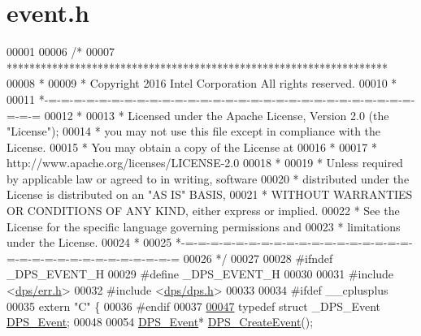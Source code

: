 \hypertarget{event_8h_source}{}\section{event.\+h}
\label{event_8h_source}

\begin{DoxyCode}
00001 
00006 \textcolor{comment}{/*}
00007 \textcolor{comment}{ *******************************************************************}
00008 \textcolor{comment}{ *}
00009 \textcolor{comment}{ * Copyright 2016 Intel Corporation All rights reserved.}
00010 \textcolor{comment}{ *}
00011 \textcolor{comment}{ *-=-=-=-=-=-=-=-=-=-=-=-=-=-=-=-=-=-=-=-=-=-=-=-=-=-=-=-=-=-=-=-=}
00012 \textcolor{comment}{ *}
00013 \textcolor{comment}{ * Licensed under the Apache License, Version 2.0 (the "License");}
00014 \textcolor{comment}{ * you may not use this file except in compliance with the License.}
00015 \textcolor{comment}{ * You may obtain a copy of the License at}
00016 \textcolor{comment}{ *}
00017 \textcolor{comment}{ *      http://www.apache.org/licenses/LICENSE-2.0}
00018 \textcolor{comment}{ *}
00019 \textcolor{comment}{ * Unless required by applicable law or agreed to in writing, software}
00020 \textcolor{comment}{ * distributed under the License is distributed on an "AS IS" BASIS,}
00021 \textcolor{comment}{ * WITHOUT WARRANTIES OR CONDITIONS OF ANY KIND, either express or implied.}
00022 \textcolor{comment}{ * See the License for the specific language governing permissions and}
00023 \textcolor{comment}{ * limitations under the License.}
00024 \textcolor{comment}{ *}
00025 \textcolor{comment}{ *-=-=-=-=-=-=-=-=-=-=-=-=-=-=-=-=-=-=-=-=-=-=-=-=-=-=-=-=-=-=-=-=}
00026 \textcolor{comment}{ */}
00027 
00028 \textcolor{preprocessor}{#ifndef \_DPS\_EVENT\_H}
00029 \textcolor{preprocessor}{#define \_DPS\_EVENT\_H}
00030 
00031 \textcolor{preprocessor}{#include <\hyperlink{err_8h}{dps/err.h}>}
00032 \textcolor{preprocessor}{#include <\hyperlink{dps_8h}{dps/dps.h}>}
00033 
00034 \textcolor{preprocessor}{#ifdef \_\_cplusplus}
00035 \textcolor{keyword}{extern} \textcolor{stringliteral}{"C"} \{
00036 \textcolor{preprocessor}{#endif}
00037 
\hyperlink{group__event_ga97617da1bac0e76646713b8665dfdd85}{00047} \textcolor{keyword}{typedef} \textcolor{keyword}{struct }\_DPS\_Event \hyperlink{group__event_ga97617da1bac0e76646713b8665dfdd85}{DPS\_Event};
00048 
00054 \hyperlink{group__event_ga97617da1bac0e76646713b8665dfdd85}{DPS\_Event}* \hyperlink{group__event_gac38abc1e32666d631a40049c90bc66d3}{DPS\_CreateEvent}();

\end{DoxyCode}
